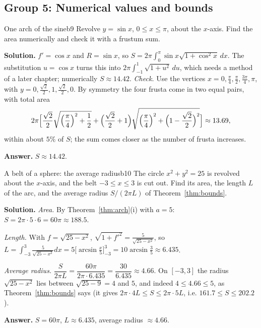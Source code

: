\documentclass[11pt]{article}
\begin{document}
\subsection*{Group 5: Numerical values and bounds}

\begin{exmp}{One arch of the sine}{b9}
Revolve $y=\sin x$, $0\le x\le\pi$, about the $x$-axis. Find the area numerically and check it with a frustum sum.

\textbf{Solution.} $f'=\cos x$ and $R=\sin x$, so $S=2\pi\int_0^\pi\sin x\sqrt{1+\cos^2x}\,dx$. The substitution $u=\cos x$ turns this into $2\pi\int_{-1}^1\sqrt{1+u^2}\,du$, which needs a method of a later chapter; numerically $S\approx14.42$.
\emph{Check.} Use the vertices $x=0,\frac\pi4,\frac\pi2,\frac{3\pi}4,\pi$, with $y=0,\frac{\sqrt2}2,1,\frac{\sqrt2}2,0$. By symmetry the four frusta come in two equal pairs, with total area
\[
2\pi\Bigl[\frac{\sqrt2}2\sqrt{\Bigl(\frac\pi4\Bigr)^2+\frac12}+\Bigl(\frac{\sqrt2}2+1\Bigr)\sqrt{\Bigl(\frac\pi4\Bigr)^2+\Bigl(1-\frac{\sqrt2}2\Bigr)^2}\Bigr]\approx13.69 ,
\]
within about $5\%$ of $S$; the sum comes closer as the number of frusta increases.

\textbf{Answer.} $S\approx14.42$.
\end{exmp}

\begin{exmp}{A belt of a sphere: the average radius}{b10}
The circle $x^2+y^2=25$ is revolved about the $x$-axis, and the belt $-3\le x\le3$ is cut out. Find its area, the length $L$ of the arc, and the average radius $S/(2\pi L)$ of Theorem~\ref{thm:bounds}.

\textbf{Solution.} \emph{Area.} By Theorem~\ref{thm:arch}(i) with $a=5$: $S=2\pi\cdot5\cdot6=60\pi\approx188.5$.

\emph{Length.} With $f=\sqrt{25-x^2}$, $\sqrt{1+f'^2}=\frac5{\sqrt{25-x^2}}$, so $L=\int_{-3}^3\frac5{\sqrt{25-x^2}}dx=5\bigl[\arcsin\frac x5\bigr]_{-3}^3=10\arcsin\frac35\approx6.435$.

\emph{Average radius.} $\dfrac S{2\pi L}=\dfrac{60\pi}{2\pi\cdot6.435}=\dfrac{30}{6.435}\approx4.66$. On $[-3,3]$ the radius $\sqrt{25-x^2}$ lies between $\sqrt{25-9}=4$ and $5$, and indeed $4\le4.66\le5$, as Theorem~\ref{thm:bounds} says (it gives $2\pi\cdot4L\le S\le2\pi\cdot5L$, i.e. $161.7\le S\le202.2$).

\textbf{Answer.} $S=60\pi$, $L\approx6.435$, average radius $\approx4.66$.
\end{exmp}
\end{document}
